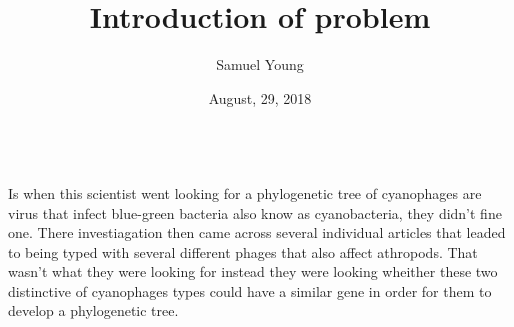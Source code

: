 \documentclass{article}
\title{}
\author{Samuel Young}
\date{August, 29, 2018}
\begin{document}
 
 \maketitle

\title{Introduction of problem}\\
  Is when this scientist went looking for a phylogenetic tree of cyanophages are virus that infect blue-green bacteria also know as cyanobacteria, they didn't fine one. There investiagation then came across several individual articles that leaded to being typed with several different  phages that also affect athropods. That wasn't what they were looking for instead they were looking wheither these two distinctive of cyanophages  types could have a similar gene in order for them to develop a phylogenetic tree. \\
     
\end{document}
